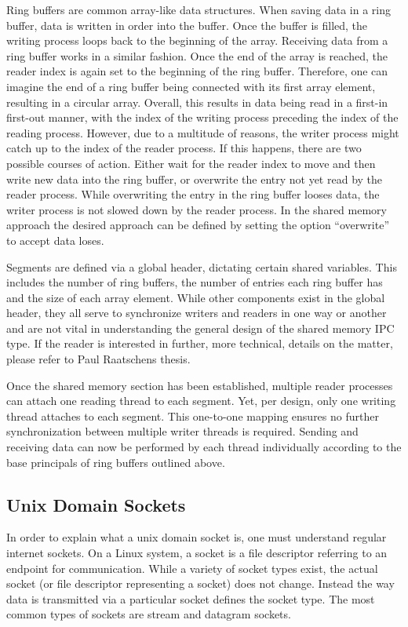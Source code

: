Ring buffers are common array-like data structures.
When saving data in a ring buffer, data is written in order into the buffer.
Once the buffer is filled, the writing process loops back to the beginning of the array.
Receiving data from a ring buffer works in a similar fashion.
Once the end of the array is reached, the reader index is again set to the beginning of the ring buffer.
Therefore, one can imagine the end of a ring buffer being connected with its first array element, resulting in a circular array.
Overall, this results in data being read in a first-in first-out manner, with the index of the writing process preceding the index of the reading process.
However, due to a multitude of reasons, the writer process might catch up to the index of the reader process.
If this happens, there are two possible courses of action.
Either wait for the reader index to move and then write new data into the ring buffer, or overwrite the entry not yet read by the reader process.
While overwriting the entry in the ring buffer looses data, the writer process is not slowed down by the reader process.
In the shared memory approach the desired approach can be defined by setting the option ``overwrite'' to accept data loses\cite{raatschen:ipc}.

Segments are defined via a global header, dictating certain shared variables.
This includes the number of ring buffers, the number of entries each ring buffer has and the size of each array element.
While other components exist in the global header, they all serve to synchronize writers and readers in one way or another and are not vital in understanding the general design of the shared memory \ac{IPC} type.
If the reader is interested in further, more technical, details on the matter, please refer to Paul Raatschens thesis\cite{raatschen:ipc}.

Once the shared memory section has been established, multiple reader processes can attach one reading thread to each segment.
Yet, per design, only one writing thread attaches to each segment.
This one-to-one mapping ensures no further synchronization between multiple writer threads is required.
Sending and receiving data can now be performed by each thread individually according to the base principals of ring buffers outlined above.

\subsection{Unix Domain Sockets}
In order to explain what a unix domain socket is, one must understand regular internet sockets.
On a Linux system, a socket is a file descriptor referring to an endpoint for communication\cite{man:sockets}.
While a variety of socket types exist, the actual socket (or file descriptor representing a socket) does not change.
Instead the way data is transmitted via a particular socket defines the socket type.
The most common types of sockets are stream and datagram sockets.

